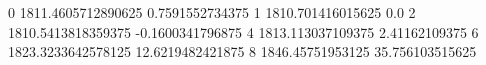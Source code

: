 0 1811.4605712890625 0.7591552734375
1 1810.701416015625 0.0
2 1810.5413818359375 -0.1600341796875
4 1813.113037109375 2.41162109375
6 1823.3233642578125 12.6219482421875
8 1846.45751953125 35.756103515625
